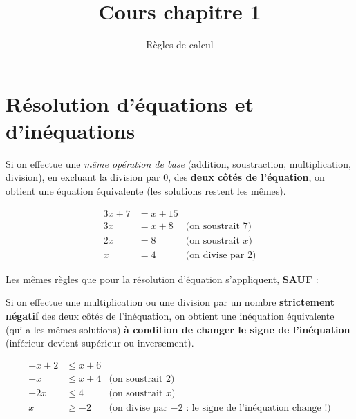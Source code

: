 \documentclass[
	10pt,
	classe=$2^{de}$,
]{coursclass}
\title{Cours chapitre 1}
\author{Règles de calcul}
\date{}
\begin{document}
\maketitle

\setcounter{section}{2}
\section{Résolution d’équations et d’inéquations}

\begin{propriete}
	Si on effectue une \textit{même opération de base} (addition, soustraction, multiplication, division), en excluant la division par $0$, des \textbf{deux côtés de l'équation}, on obtient une équation équivalente (les solutions restent les mêmes).
\end{propriete}

\begin{exemple}
	\begin{align*}
		3x + 7 & = x + 15 &                           \\
		3x     & = x + 8  & \text{(on soustrait 7)}   \\
		2x     & = 8      & \text{(on soustrait $x$)} \\
		x      & = 4      & \text{(on divise par 2)}
	\end{align*}
\end{exemple}

\begin{propriete}
	Les mêmes règles que pour la résolution d'équation s'appliquent, \textbf{SAUF} :

	Si on effectue une multiplication ou une division par un nombre \textbf{strictement négatif} des deux côtés de l’inéquation, on obtient une inéquation équivalente (qui a les mêmes solutions) \textbf{à condition de changer le signe de l’inéquation} (inférieur devient supérieur ou inversement).
\end{propriete}

\begin{exemple}
	\begin{align*}
		-x + 2 & ≤ x + 6 &                                                                 \\
		-x     & ≤ x + 4 & \text{(on soustrait 2)}                                         \\
		-2x    & ≤ 4     & \text{(on soustrait $x$)}                                       \\
		x      & ≥ -2    & \text{(on divise par $-2$ : le signe de l'inéquation change !)} \\
	\end{align*}
\end{exemple}
\end{document}
